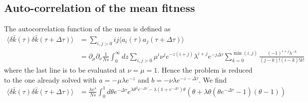 \documentclass[prl,preprint]{revtex4}
\newcommand{\dk}{\delta \bar{k}}
\newcommand{\la}{\langle}
\newcommand{\ra}{\rangle}
\begin{document}
\subsection*{Auto-correlation of the mean fitness}
The autocorrelation function of the mean is defined as
\begin{equation}
\begin{split}
\la \dk(\tau) \dk(\tau+\Delta\tau) \ra &= \sum_{i,j>0} ij \la a_i(\tau)a_j(\tau+\Delta\tau)\ra \\
&= \partial_\mu \partial_\nu \frac{1}{Ns} \int_0^\infty dz \sum_{i,j>0} \mu^i \nu^j e^{-z(i+j)}\lambda^{i+j}e^{-j\Delta\tau}\sum_{k=0}^{\min(i,j)} \frac{(-1)^{i+j}\lambda^{-k}}{(j-k)!(i-k)!k!}
\end{split}
\end{equation}
where the last line is to be evaluated at $\nu=\mu=1$. Hence the problem is reduced to the one already solved with $a=-\mu\lambda e^{-z}$ and $b=-\nu\lambda e^{-z-\Delta\tau}$. We find 
\begin{equation}
\begin{split}
\langle\dk(\tau) \dk(\tau+\Delta\tau )\rangle  %
 & =\frac{\lambda e^{\lambda}}{Ns}\int_0^1 d\theta e^{-\Delta\tau } e^{\lambda \theta^2e^{-\Delta\tau } -\lambda(1+e^{-\Delta\tau }) \theta} \left(\theta  +\lambda \theta\left(\theta e^{-\Delta\tau }- 1\right)\left(\theta- 1\right)\right)
 \end{split}
\end{equation}
\end{document}
